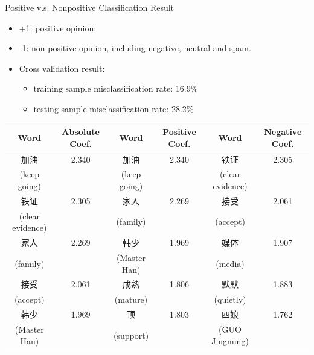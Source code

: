 \documentclass[12pt]{beamer}
\newcommand{\1}[1]{{\mathbf 1}\left\{#1\right\}}        %
\begin{document}
\begin{frame}{Positive v.s. Nonpositive Classification Result}

\begin{itemize}[<+->]
\item +1: positive opinion;
\item -1: non-positive opinion, including negative, neutral and spam.
\item Cross validation result: 
  \begin{itemize}[<+->]
  \item training sample misclassification rate: 16.9\%
  \item testing sample misclassification rate: 28.2\%
  \end{itemize}

\end{itemize}


\tiny
\begin{tabular}{|c|c||c|c||c|c|}
\hline
Word & Absolute Coef. & Word & Positive Coef. & Word & Negative Coef.\\ \hline \hline
加油 & 2.340 & 加油 & 2.340 & 铁证 & 2.305\\
(keep going) & & (keep going) & & (clear evidence) & \\\hline
铁证 & 2.305 & 家人 & 2.269 & 接受 & 2.061\\
(clear evidence) & & (family) & & (accept) & \\\hline
家人 & 2.269 & 韩少 & 1.969 & 媒体 & 1.907\\
(family) & & (Master Han) & & (media) & \\\hline
接受 & 2.061 & 成熟 & 1.806 & 默默 & 1.883\\
(accept) & & (mature) & & (quietly) & \\\hline
韩少 & 1.969 & 顶 & 1.803 & 四娘 & 1.762\\
(Master Han) & & (support) & & (GUO Jingming) & \\\hline
\end{tabular}

\end{frame}
\end{document}
